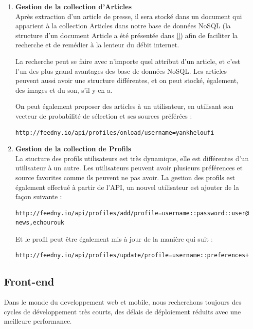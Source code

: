         \begin{enumerate}[leftmargin=*]
            \item\textbf{Gestion de la collection d'Articles}\\
            Après extraction d'un article de presse, il sera stocké dans un document qui apparient à la collection Articles dans notre base de données NoSQL (la structure d'un document Article a été présentée dans \autoref{}) afin de faciliter la recherche et de remédier à la lenteur du débit internet. 

            La recherche peut se faire avec n'importe quel attribut d'un article, et c'est l'un des plus grand avantages des base de données NoSQL. Les articles peuvent aussi avoir une structure différentes, et on peut stocké, également, des images et du son, s'il y-en a.

            On peut également proposer des articles à un utilisateur, en utilisant son vecteur de probabilité de sélection et ses sources préférées : 
\begin{lstlisting}[style=api] 
  http://feedny.io/api/profiles/onload/username=yankheloufi
\end{lstlisting} 
            
            \item\textbf{Gestion de la collection de Profils}\\
            La stucture des profils utilisateurs est très dynamique, elle est différentes d'un utilisateur à un autre. Les utilisateurs peuvent avoir plusieurs préférences et source favorites comme ils peuvent ne pas avoir. La gestion des profils est également effectué à partir de l'API, un nouvel utilisateur est ajouter de la façon suivante :   
\begin{lstlisting}[style=api] 
  http://feedny.io/api/profiles/add/profile=username::password::user@hey.com::sport,religion::bbc-news,echourouk
\end{lstlisting} 
            
            Et le profil peut être également mis à jour de la manière qui suit : 
\begin{lstlisting}[style=api] 
  http://feedny.io/api/profiles/update/profile=username::preferences+algeria
\end{lstlisting}            
        \end{enumerate} 

    \subsection{Front-end}
    Dans le monde du developpement web et mobile, nous recherchons toujours des cycles de développement très courts, des délais de déploiement réduits avec une meilleure performance.

